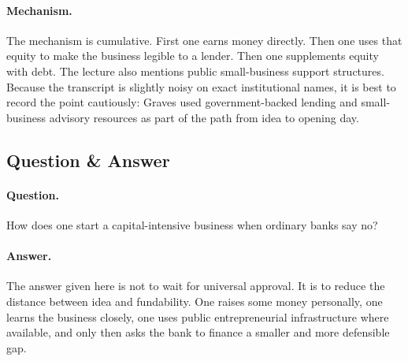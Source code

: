 \begin{figure}[h]
\centering
{}
\end{figure}

\paragraph{Mechanism.}
The mechanism is cumulative. First one earns money directly. Then one uses that equity to make the business legible to a lender. Then one supplements equity with debt. The lecture also mentions public small-business support structures. Because the transcript is slightly noisy on exact institutional names, it is best to record the point cautiously: Graves used government-backed lending and small-business advisory resources as part of the path from idea to opening day.

\subsection{Question \& Answer}

\paragraph{Question.}
How does one start a capital-intensive business when ordinary banks say no?

\paragraph{Answer.}
The answer given here is not to wait for universal approval. It is to reduce the distance between idea and fundability. One raises some money personally, one learns the business closely, one uses public entrepreneurial infrastructure where available, and only then asks the bank to finance a smaller and more defensible gap.

